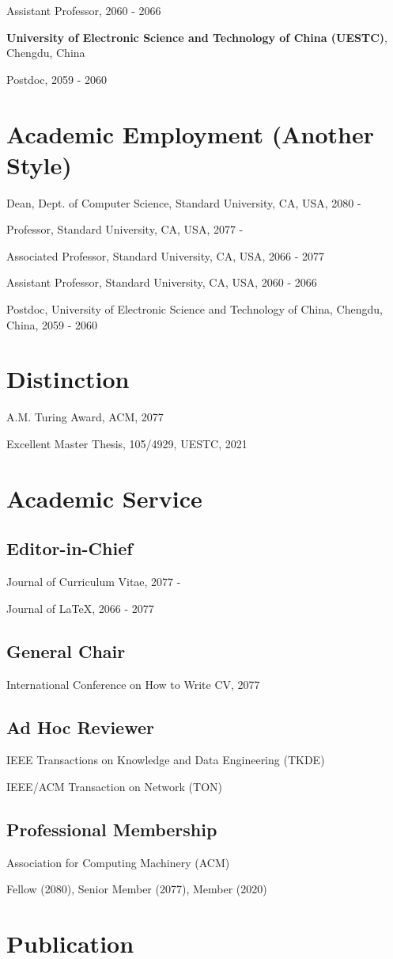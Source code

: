 \documentclass{article}
\newcommand{\cvsection}[1]{\section*{\rmfamily#1}}
\newcommand{\cvsubsection}[1]{\subsection*{\rmfamily\hspace{1.6em}#1}}
\begin{document}
\hspace{2em}Assistant Professor, 2060 - 2066

\textbf{University of Electronic Science and Technology of China (UESTC)}, Chengdu, China

\hspace{2em}Postdoc, 2059 - 2060


\cvsection{Academic Employment (Another Style)}
\indent

Dean, Dept. of Computer Science, Standard University, CA, USA, 2080 -

Professor, Standard University, CA, USA, 2077 -

Associated Professor, Standard University, CA, USA, 2066 - 2077

Assistant Professor, Standard University, CA, USA, 2060 - 2066

Postdoc, University of Electronic Science and Technology of China, Chengdu, China, 2059 - 2060




\cvsection{Distinction}
\indent

A.M. Turing Award, ACM, 2077

Excellent Master Thesis, 105/4929, UESTC, 2021


\cvsection{Academic Service}

\cvsubsection{Editor-in-Chief}
\indent

Journal of Curriculum Vitae, 2077 -

Journal of \LaTeX, 2066 - 2077

\cvsubsection{General Chair}
\indent

International Conference on How to Write CV, 2077

\cvsubsection{Ad Hoc Reviewer}
\indent

IEEE Transactions on Knowledge and Data Engineering (TKDE)

IEEE/ACM Transaction on Network (TON)

\cvsubsection{Professional Membership}
\indent

Association for Computing Machinery (ACM)

\hspace{2em}Fellow (2080), Senior Member (2077), Member (2020)




\section*{Publication}
\end{document}
